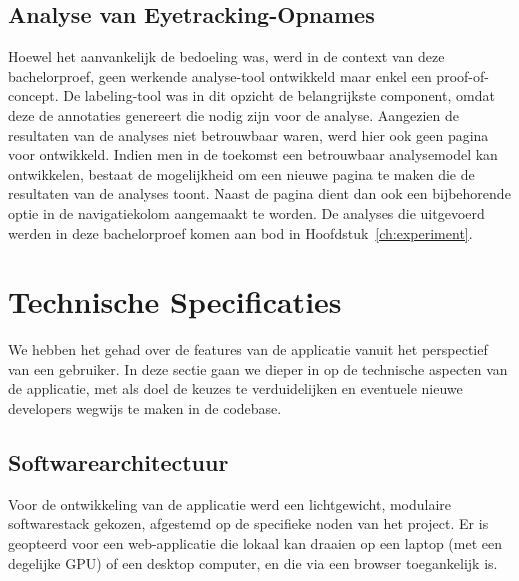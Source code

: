 \subsection{Analyse van Eyetracking-Opnames}

Hoewel het aanvankelijk de bedoeling was, werd in de context van deze bachelorproef, geen werkende analyse-tool ontwikkeld maar enkel een proof-of-concept.
De labeling-tool was in dit opzicht de belangrijkste component, omdat deze de annotaties genereert die nodig zijn voor de analyse.
Aangezien de resultaten van de analyses niet betrouwbaar waren, werd hier ook geen pagina voor ontwikkeld.
Indien men in de toekomst een betrouwbaar analysemodel kan ontwikkelen, bestaat de mogelijkheid om een nieuwe pagina te maken die de resultaten van de analyses toont.
Naast de pagina dient dan ook een bijbehorende optie in de navigatiekolom aangemaakt te worden.
De analyses die uitgevoerd werden in deze bachelorproef komen aan bod in Hoofdstuk~\ref{ch:experiment}.

\section{Technische Specificaties}

We hebben het gehad over de features van de applicatie vanuit het perspectief van een gebruiker.
In deze sectie gaan we dieper in op de technische aspecten van de applicatie, 
met als doel de keuzes te verduidelijken en eventuele nieuwe developers wegwijs te maken in de codebase.

\subsection{Softwarearchitectuur}

Voor de ontwikkeling van de applicatie werd een lichtgewicht, modulaire softwarestack gekozen, afgestemd op de specifieke noden van het project.
Er is geopteerd voor een web-applicatie die lokaal kan draaien op een laptop (met een degelijke GPU) of een desktop computer, en die via een browser toegankelijk is.

